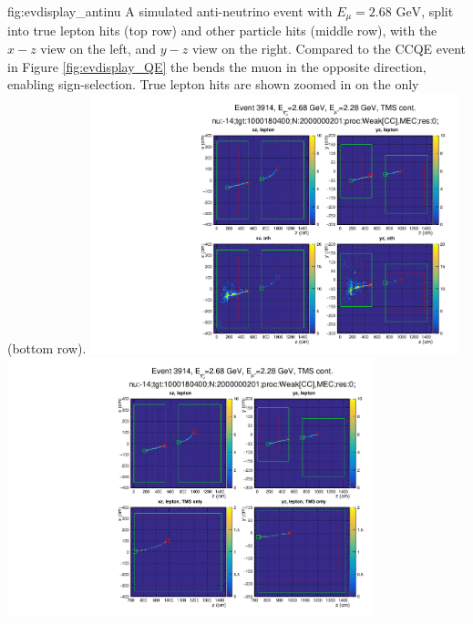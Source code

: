 
\begin{dunefigure}{fig:evdisplay_antinu}
{A simulated anti-neutrino  event with $E_\mu=2.68\text{ GeV}$, split into true lepton hits (top row) and other particle hits (middle row), with the $x-z$ view on the left, and $y-z$ view on the right. Compared to the CCQE event in Figure \ref{fig:evdisplay_QE} the  bends the muon in the opposite direction, enabling sign-selection. True lepton hits are shown zoomed in on the  only (bottom row).}
\includegraphics[trim=0 0 0 55, clip,width=0.8\textwidth]{graphics/tms/Simulation/EventDisplay/pg_0011.pdf}
\\[\smallskipamount]
\includegraphics[trim=0 0 0 305, clip,width=0.8\textwidth]{graphics/tms/Simulation/EventDisplay/pg_0012.pdf}
\end{dunefigure}

